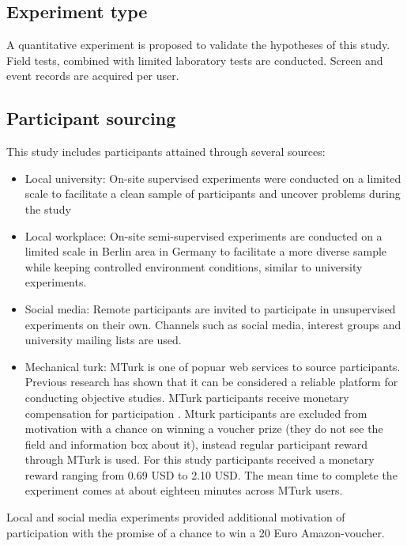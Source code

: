 \subsection{Experiment type} A quantitative experiment is proposed to validate the hypotheses of this study. Field tests, combined with limited laboratory tests are conducted. Screen and event records are acquired per user.

\subsection{Participant sourcing} 
This study includes participants attained through several sources:
\begin{itemize}
	\item{Local university:} On-site supervised experiments were conducted on a limited scale to facilitate a clean sample of participants and uncover problems during the study
	
	\item{Local workplace:} On-site semi-supervised experiments are conducted on a limited scale in Berlin area in Germany to facilitate a more diverse sample while keeping controlled environment conditions, similar to university experiments.
	
	\item{Social media:} Remote participants are invited to participate in unsupervised experiments on their own. Channels such as social media, interest groups and university mailing lists are used.
	
	\item{Mechanical turk:} MTurk is one of popuar web services to source participants. Previous research has shown that it can be considered a reliable platform for conducting objective studies. MTurk participants receive monetary compensation for participation \cite{Buhrmester2011a}. Mturk participants are excluded from motivation with a chance on winning a voucher prize (they do not see the field and information box about it), instead regular participant reward through MTurk is used. For this study participants received a monetary reward ranging from 0.69 USD to 2.10 USD. The mean time to complete the experiment comes at about eighteen minutes across MTurk users. 
	
\end{itemize}

Local and social media experiments provided additional motivation of participation with the promise of a chance to win a 20 Euro Amazon-voucher.